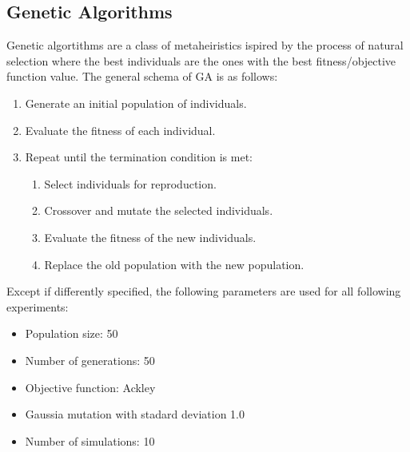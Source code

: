 \subsection{Genetic Algorithms}
Genetic algortithms are a class of metaheiristics ispired by the process of natural selection where the best individuals are the ones with the best fitness/objective function value. The general schema of GA is as follows:
\begin{enumerate}
    \item Generate an initial population of individuals.
    \item Evaluate the fitness of each individual.
    \item Repeat until the termination condition is met:
          \begin{enumerate}
              \item Select individuals for reproduction.
              \item Crossover and mutate the selected individuals.
              \item Evaluate the fitness of the new individuals.
              \item Replace the old population with the new population.
          \end{enumerate}
\end{enumerate}

Except if differently specified, the following parameters are used for all following experiments:
\begin{itemize}
    \item Population size: 50
    \item Number of generations: 50
    \item Objective function: Ackley
    \item Gaussia mutation with stadard deviation 1.0
    \item Number of simulations: 10
\end{itemize}

